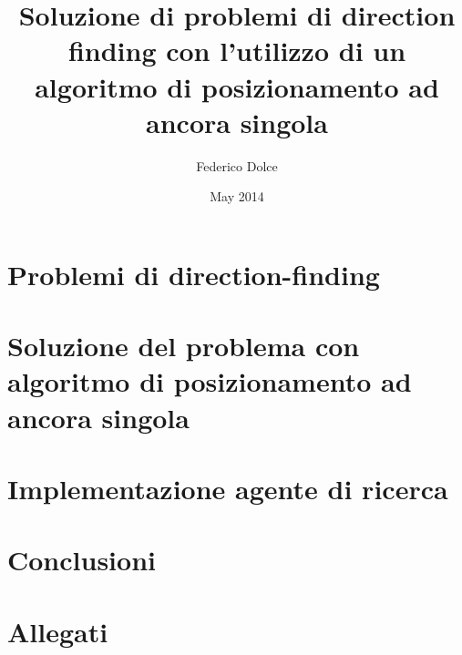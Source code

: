 \documentclass{report}
\begin{document}
\frontmatter
\title{Soluzione di problemi di direction finding con l'utilizzo di un algoritmo di posizionamento ad ancora singola}
\author{Federico Dolce}
\date{May 2014}
\maketitle
\begin{abstract}

\end{abstract}
\tableofcontents
\mainmatter

\chapter{Problemi di direction-finding}
	

\chapter{Soluzione del problema con algoritmo di posizionamento ad ancora singola}
	


\chapter{Implementazione agente di ricerca}
	

\chapter{Conclusioni}
	

\appendix
\chapter{Allegati}
	
	
\end{document}
